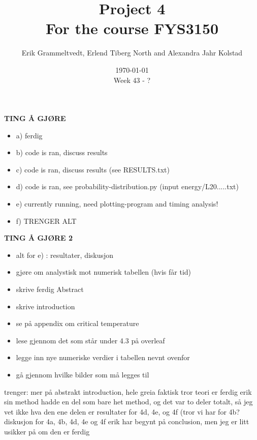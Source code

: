 \documentclass{article}
\begin{document}
\addtocounter{page}{0}

\title{Project 4 \\
      \large For the course FYS3150}
\date{\today \\
    \vspace{1mm}
    \large Week 43 - ?}

\author{Erik Grammeltvedt, Erlend Tiberg North and Alexandra Jahr Kolstad}

\maketitle




\textbf{TING Å GJØRE}
\begin{itemize}
  \item a) ferdig
  \item b) code is ran, discuss results
  \item c) code is ran, discuss results (see RESULTS.txt)
  \item d) code is ran, see probability-distribution.py (input energy/L20.....txt)
  \item e) currently running, need plotting-program and timing analysis!
  \item f) TRENGER ALT
\end{itemize}

\textbf{TING Å GJØRE 2}
\begin{itemize}
  \item alt for e) : resultater, diskusjon
  \item gjøre om analystisk mot numerisk tabellen (hvis får tid)
  \item skrive ferdig Abstract
  \item skrive introduction
  \item se på appendix om critical temperature
  \item lese gjennom det som står under 4.3 på overleaf
  \item legge inn nye numeriske verdier i tabellen nevnt ovenfor
  \item gå gjennom hvilke bilder som må legges til
\end{itemize}

trenger:
mer på abstrakt
introduction, hele greia faktisk
tror teori er ferdig
erik sin method hadde en del som bare het method, og det var to deler totalt, så jeg vet ikke hva den ene delen er
resultater for 4d, 4e, og 4f (tror vi har for 4b?
diskusjon for 4a, 4b, 4d, 4e og 4f erik har begynt på conclusion, men jeg er litt usikker på om den er ferdig
\end{document}
